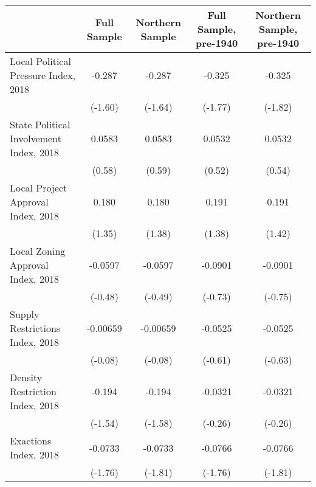 \begin{table}[htbp]\centering
\def\sym#1{\ifmmode^{#1}\else\(^{#1}\)\fi}
\caption{ \label{tab1}}
\begin{tabular}{l*{4}{c}}
\toprule
                    &\multicolumn{1}{c}{Full Sample}&\multicolumn{1}{c}{Northern Sample}&\multicolumn{1}{c}{Full Sample, pre-1940}&\multicolumn{1}{c}{Northern Sample, pre-1940}\\
\midrule
Local Political Pressure Index, 2018&      -0.287         &      -0.287         &      -0.325         &      -0.325         \\
                    &     (-1.60)         &     (-1.64)         &     (-1.77)         &     (-1.82)         \\
\addlinespace
State Political Involvement Index, 2018&      0.0583         &      0.0583         &      0.0532         &      0.0532         \\
                    &      (0.58)         &      (0.59)         &      (0.52)         &      (0.54)         \\
\addlinespace
Local Project Approval Index, 2018&       0.180         &       0.180         &       0.191         &       0.191         \\
                    &      (1.35)         &      (1.38)         &      (1.38)         &      (1.42)         \\
\addlinespace
Local Zoning Approval Index, 2018&     -0.0597         &     -0.0597         &     -0.0901         &     -0.0901         \\
                    &     (-0.48)         &     (-0.49)         &     (-0.73)         &     (-0.75)         \\
\addlinespace
Supply Restrictions Index, 2018&    -0.00659         &    -0.00659         &     -0.0525         &     -0.0525         \\
                    &     (-0.08)         &     (-0.08)         &     (-0.61)         &     (-0.63)         \\
\addlinespace
Density Restriction Index, 2018&      -0.194         &      -0.194         &     -0.0321         &     -0.0321         \\
                    &     (-1.54)         &     (-1.58)         &     (-0.26)         &     (-0.26)         \\
\addlinespace
Exactions Index, 2018&     -0.0733         &     -0.0733         &     -0.0766         &     -0.0766         \\
                    &     (-1.76)         &     (-1.81)         &     (-1.76)         &     (-1.81)         \\

\end{tabular}
\end{table}
